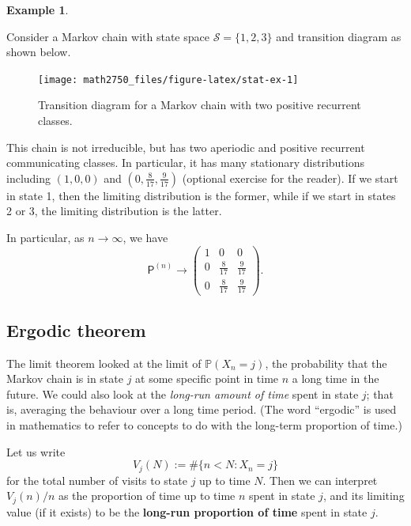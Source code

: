 \documentclass[
  a4paper,
]{article}
\theoremstyle{definition}
\theoremstyle{definition}
\newtheorem{example}{Example}[section]
\theoremstyle{definition}
\theoremstyle{remark}
\begin{document}
\begin{example}
\protect\hypertarget{exm:conv5}{}\label{exm:conv5}

Consider a Markov chain with state space \(\mathcal S = \{1,2,3\}\) and transition diagram as shown below.

\begin{figure}

{\centering \texttt{[image: math2750\_files/figure-latex/stat-ex-1]} 

}

\caption{Transition diagram for a Markov chain with two positive recurrent classes.}\label{fig:stat-ex}
\end{figure}

This chain is not irreducible, but has two aperiodic and positive recurrent communicating classes. In particular, it has many stationary distributions including \((1, 0, 0)\) and \((0, \frac8{17}, \frac9{17})\) (optional exercise for the reader). If we start in state 1, then the limiting distribution is the former, while if we start in states 2 or 3, the limiting distribution is the latter.

In particular, as \(n \to \infty\), we have
\[ \mathsf P^{(n)} \to \begin{pmatrix} 1 & 0 & 0 \\ 0 & \frac8{17} & \frac9{17} \\ 0 & \frac8{17} & \frac9{17} \end{pmatrix}. \]

\end{example}

\hypertarget{S11-ergodic}{%
\subsection{Ergodic theorem}\label{S11-ergodic}}

The limit theorem looked at the limit of \(\mathbb P(X_n = j)\), the probability that the Markov chain is in state \(j\) at some specific point in time \(n\) a long time in the future. We could also look at the \emph{long-run amount of time} spent in state \(j\); that is, averaging the behaviour over a long time period. (The word ``ergodic'' is used in mathematics to refer to concepts to do with the long-term proportion of time.)

Let us write
\[ V_j(N) := \# \big\{ n < N : X_n = j \} \]
for the total number of visits to state \(j\) up to time \(N\). Then we can interpret \(V_j(n)/n\) as the proportion of time up to time \(n\) spent in state \(j\), and its limiting value (if it exists) to be the \textbf{long-run proportion of time} spent in state \(j\).
\end{document}
